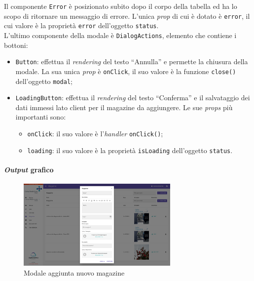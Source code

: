 Il componente \texttt{Error} è posizionato subito dopo il corpo della tabella ed ha lo scopo di ritornare un messaggio di errore. L'unica \textit{prop} di cui è dotato è \texttt{error}, il cui valore è la proprietà \texttt{error} dell'oggetto \texttt{status}.\\
L'ultimo componente della modale è \texttt{DialogActions}, elemento che contiene i bottoni:
\begin{itemize}
    \item \texttt{Button}: effettua il \textit{rendering} del testo “Annulla” e permette la chiusura della modale. La sua unica \textit{prop} è \texttt{onClick}, il suo valore è la funzione \texttt{close()} dell'oggetto \texttt{modal};
   
    \item \texttt{LoadingButton}: effettua il \textit{rendering} del testo “Conferma” e il salvataggio dei dati immessi lato client per il magazine da aggiungere. Le sue \textit{props} più importanti sono:
    \begin{itemize}
        \item \texttt{onClick}: il suo valore è l'\textit{handler} \texttt{onClick()};
        \item \texttt{loading}: il suo valore è la proprietà \texttt{isLoading} dell'oggetto \texttt{status}.
    \end{itemize}
\end{itemize}



\paragraph{\textit{Output} grafico}
\begin{figure}[H]
    \centering
    \includegraphics[width=0.7\textwidth]{images/capitolo5/f6_magazines/ModalMagazine_create.png} 
    \caption{Modale aggiunta nuovo magazine} 
    \label{fig:ModalMagazine_create}
\end{figure}

